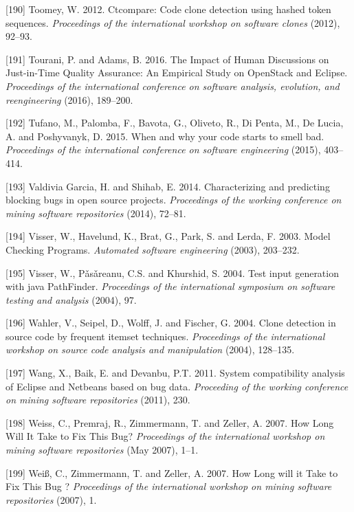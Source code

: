 \documentclass[12pt]{report}
\begin{document}
\hypertarget{ref-Toomey2012}{}
{[}190{]} Toomey, W. 2012. Ctcompare: Code clone detection using hashed
token sequences. \emph{Proceedings of the international workshop on
software clones} (2012), 92--93.

\hypertarget{ref-Tourani2016}{}
{[}191{]} Tourani, P. and Adams, B. 2016. The Impact of Human
Discussions on Just-in-Time Quality Assurance: An Empirical Study on
OpenStack and Eclipse. \emph{Proceedings of the international conference
on software analysis, evolution, and reengineering} (2016), 189--200.

\hypertarget{ref-Tufano2015}{}
{[}192{]} Tufano, M., Palomba, F., Bavota, G., Oliveto, R., Di Penta,
M., De Lucia, A. and Poshyvanyk, D. 2015. When and why your code starts
to smell bad. \emph{Proceedings of the international conference on
software engineering} (2015), 403--414.

\hypertarget{ref-ValdiviaGarcia2014}{}
{[}193{]} Valdivia Garcia, H. and Shihab, E. 2014. Characterizing and
predicting blocking bugs in open source projects. \emph{Proceedings of
the working conference on mining software repositories} (2014), 72--81.

\hypertarget{ref-Visser2003}{}
{[}194{]} Visser, W., Havelund, K., Brat, G., Park, S. and Lerda, F.
2003. Model Checking Programs. \emph{Automated software engineering}
(2003), 203--232.

\hypertarget{ref-Visser2004}{}
{[}195{]} Visser, W., Pǎsǎreanu, C.S. and Khurshid, S. 2004. Test input
generation with java PathFinder. \emph{Proceedings of the international
symposium on software testing and analysis} (2004), 97.

\hypertarget{ref-Wahler}{}
{[}196{]} Wahler, V., Seipel, D., Wolff, J. and Fischer, G. 2004. Clone
detection in source code by frequent itemset techniques.
\emph{Proceedings of the international workshop on source code analysis
and manipulation} (2004), 128--135.

\hypertarget{ref-Wang2011}{}
{[}197{]} Wang, X., Baik, E. and Devanbu, P.T. 2011. System
compatibility analysis of Eclipse and Netbeans based on bug data.
\emph{Proceeding of the working conference on mining software
repositories} (2011), 230.

\hypertarget{ref-Weiss2007}{}
{[}198{]} Weiss, C., Premraj, R., Zimmermann, T. and Zeller, A. 2007.
How Long Will It Take to Fix This Bug? \emph{Proceedings of the
international workshop on mining software repositories} (May 2007),
1--1.

\hypertarget{ref-Weiuxdf2007}{}
{[}199{]} Weiß, C., Zimmermann, T. and Zeller, A. 2007. How Long will it
Take to Fix This Bug ? \emph{Proceedings of the international workshop
on mining software repositories} (2007), 1.
\end{document}
